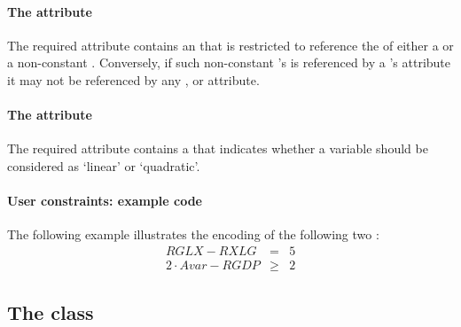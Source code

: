 \paragraph{The  attribute}
The required  attribute contains an  that is restricted to reference the  of either a \Reaction or a non-constant \Parameter. Conversely, if such non-constant \Parameter's  is referenced by a \UserConstraintComponent's  attribute it may not be referenced by any ,  or  attribute.

\paragraph{The  attribute}
The required  attribute contains a  that indicates whether a variable should be considered as `linear' or `quadratic'.

\paragraph{User constraints: example code}
The following example illustrates the encoding of the following two :
\begin{eqnarray}
  RGLX - RXLG  &=& 5 \\
  2\cdot Avar - RGDP &\geq& 2
\end{eqnarray}





\subsection{The \FBC {} class}
\label{listofkeyvaluepairs-class}

